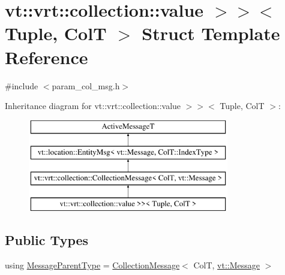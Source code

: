 \hypertarget{structvt_1_1vrt_1_1collection_1_1_param_col_msg_3_01_tuple_00_01_col_t_00_01std_1_1enable__if__te13868956e9675e27cec8f332bda9d5e}{}\section{vt\+:\+:vrt\+:\+:collection\+:\+:value $>$$>$$<$ Tuple, ColT $>$ Struct Template Reference}
\label{structvt_1_1vrt_1_1collection_1_1_param_col_msg_3_01_tuple_00_01_col_t_00_01std_1_1enable__if__te13868956e9675e27cec8f332bda9d5e}


{\ttfamily \#include $<$param\+\_\+col\+\_\+msg.\+h$>$}

Inheritance diagram for vt\+:\+:vrt\+:\+:collection\+:\+:value $>$$>$$<$ Tuple, ColT $>$\+:\begin{figure}[H]
\begin{center}
\leavevmode
\includegraphics[height=4.000000cm]{structvt_1_1vrt_1_1collection_1_1_param_col_msg_3_01_tuple_00_01_col_t_00_01std_1_1enable__if__te13868956e9675e27cec8f332bda9d5e}
\end{center}
\end{figure}
\subsection*{Public Types}
\begin{DoxyCompactItemize}
\item 
using \hyperlink{structvt_1_1vrt_1_1collection_1_1_param_col_msg_3_01_tuple_00_01_col_t_00_01std_1_1enable__if__te13868956e9675e27cec8f332bda9d5e_a31b328a8e2c5e1801564baf8d3e8bf04}{Message\+Parent\+Type} = \hyperlink{structvt_1_1vrt_1_1collection_1_1_collection_message}{Collection\+Message}$<$ ColT, \hyperlink{namespacevt_a3a3ddfef40b4c90915fa43cdd5f129ea}{vt\+::\+Message} $>$
\end{DoxyCompactItemize}
